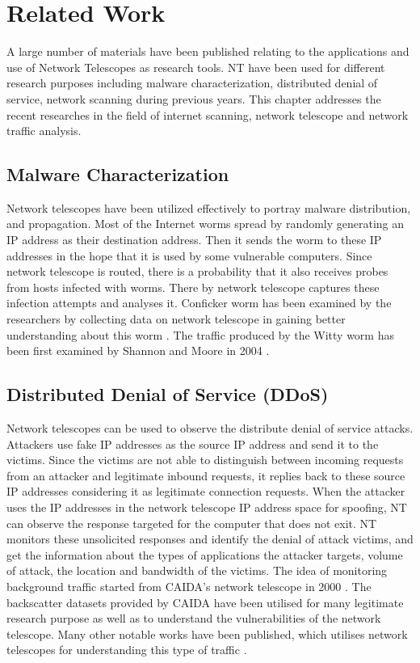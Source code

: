 \chapter{Related Work}\label{chap:Background and Related Work}
    A large number of materials have been published relating to the applications and use of Network Telescopes as research tools.
    NT have been used for different research purposes including malware characterization, distributed denial of service, network scanning during previous years.
    This  chapter  addresses the recent researches in the field of internet scanning, network telescope and network traffic analysis.
    \section{Malware Characterization} 
    Network telescopes have been utilized effectively to portray malware distribution, and propagation.
    Most of the Internet worms spread by randomly generating an IP address as their destination address.
    Then it sends the worm to these IP addresses in the hope that it is used by some vulnerable computers.
    Since network telescope is routed, there is a probability that it also receives probes from hosts infected with worms.
    There by network telescope captures these infection attempts and analyses it.
    Conficker worm \cite{porras2009conficker} has been examined by the researchers by collecting data on network telescope in gaining better understanding about this worm \cite{irwin2012network}.
    The traffic produced by the Witty worm has been first examined by Shannon and Moore in 2004 \cite{shannon2004spread}.
    \section{Distributed Denial of Service (DDoS)}
    Network telescopes can be used to observe the distribute denial of service attacks.
    Attackers use fake IP addresses as the source IP address and send it to the victims.
    Since the victims are not able to distinguish between incoming requests from an attacker and legitimate inbound requests, it replies back to these source IP addresses considering it as legitimate connection requests.
    When the attacker uses the IP addresses in the network telescope IP address space for spoofing, NT can observe the response targeted for the computer that does not exit. 
    NT monitors these unsolicited responses and identify the denial of attack victims, and get the information about the types of applications the attacker targets, volume of attack, the location and bandwidth of the victims.
    The idea of monitoring background traffic started from CAIDA's network telescope in 2000 \cite{caida}.
    The backscatter datasets provided by CAIDA have been utilised for many legitimate research purpose as well as to understand the vulnerabilities of the network telescope.
    Many other notable  works have been published, which utilises network telescopes for understanding this type of traffic \cite{moore2006inferring}\cite{stavrou2005websos}\cite{kompella2004scalable}\cite{pouget2008understanding}.

